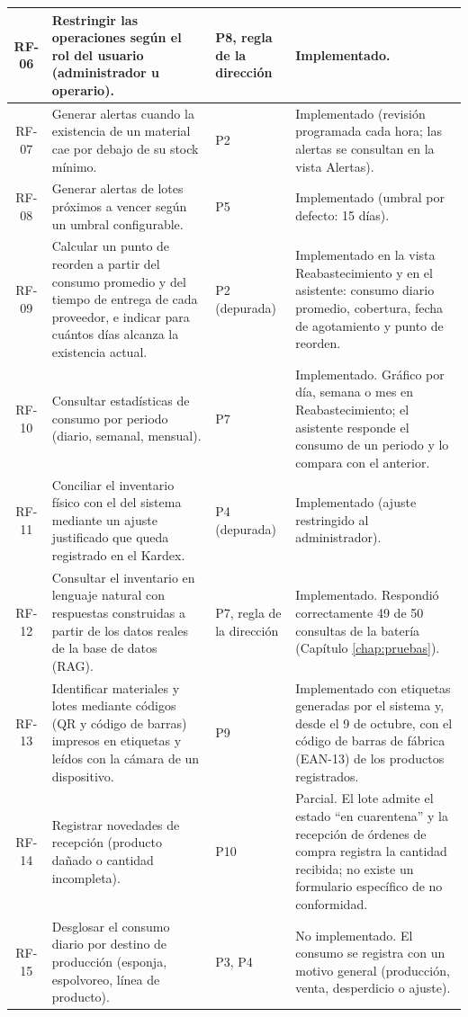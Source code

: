 \begin{longtable}{|c|p{6.3cm}|p{1.9cm}|p{4.2cm}|}
RF-06 & Restringir las operaciones según el rol del usuario (administrador u operario). & P8, regla de la dirección & Implementado. \\ \hline
RF-07 & Generar alertas cuando la existencia de un material cae por debajo de su stock mínimo. & P2 & Implementado (revisión programada cada hora; las alertas se consultan en la vista Alertas). \\ \hline
RF-08 & Generar alertas de lotes próximos a vencer según un umbral configurable. & P5 & Implementado (umbral por defecto: 15 días). \\ \hline
RF-09 & Calcular un punto de reorden a partir del consumo promedio y del tiempo de entrega de cada proveedor, e indicar para cuántos días alcanza la existencia actual. & P2 (depurada) & Implementado en la vista Reabastecimiento y en el asistente: consumo diario promedio, cobertura, fecha de agotamiento y punto de reorden. \\ \hline
RF-10 & Consultar estadísticas de consumo por periodo (diario, semanal, mensual). & P7 & Implementado. Gráfico por día, semana o mes en Reabastecimiento; el asistente responde el consumo de un periodo y lo compara con el anterior. \\ \hline
RF-11 & Conciliar el inventario físico con el del sistema mediante un ajuste justificado que queda registrado en el Kardex. & P4 (depurada) & Implementado (ajuste restringido al administrador). \\ \hline
RF-12 & Consultar el inventario en lenguaje natural con respuestas construidas a partir de los datos reales de la base de datos (RAG). & P7, regla de la dirección & Implementado. Respondió correctamente 49 de 50 consultas de la batería (Capítulo \ref{chap:pruebas}). \\ \hline
RF-13 & Identificar materiales y lotes mediante códigos (QR y código de barras) impresos en etiquetas y leídos con la cámara de un dispositivo. & P9 & Implementado con etiquetas generadas por el sistema y, desde el 9 de octubre, con el código de barras de fábrica (EAN-13) de los productos registrados. \\ \hline
RF-14 & Registrar novedades de recepción (producto dañado o cantidad incompleta). & P10 & Parcial. El lote admite el estado ``en cuarentena'' y la recepción de órdenes de compra registra la cantidad recibida; no existe un formulario específico de no conformidad. \\ \hline
RF-15 & Desglosar el consumo diario por destino de producción (esponja, espolvoreo, línea de producto). & P3, P4 & No implementado. El consumo se registra con un motivo general (producción, venta, desperdicio o ajuste). \\ \hline

\end{longtable}
